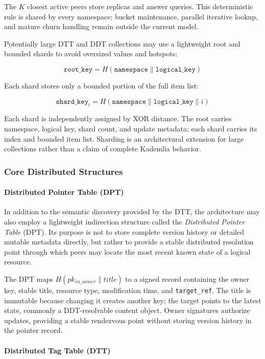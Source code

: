 \documentclass[12pt]{article}
\begin{document}
The $K$ closest active peers store replicas and answer queries. This deterministic rule is shared by every namespace; bucket maintenance, parallel iterative lookup, and mature churn handling remain outside the current model.

Potentially large DTT and DDT collections may use a lightweight root and bounded shards to avoid oversized values and hotspots:

\[
\texttt{root\_key} = H(\texttt{namespace} \parallel \texttt{logical\_key})
\]

Each shard stores only a bounded portion of the full item list:

\[
\texttt{shard\_key}_i = H(\texttt{namespace} \parallel \texttt{logical\_key} \parallel i)
\]

Each shard is independently assigned by XOR distance. The root carries namespace, logical key, shard count, and update metadata; each shard carries its index and bounded item list. Sharding is an architectural extension for large collections rather than a claim of complete Kademlia behavior.


\subsubsection{Core Distributed Structures}

\paragraph{Distributed Pointer Table (DPT)}

In addition to the semantic discovery provided by the DTT, the architecture may also employ a lightweight indirection structure called the \textit{Distributed Pointer Table} (DPT). Its purpose is not to store complete version history or detailed mutable metadata directly, but rather to provide a stable distributed resolution point through which peers may locate the most recent known state of a logical resource.

The DPT maps $H(pk_{vn\_owner} \parallel title)$ to a signed record containing the owner key, stable title, resource type, modification time, and \texttt{target\_ref}. The title is immutable because changing it creates another key; the target points to the latest state, commonly a DDT-resolvable content object. Owner signatures authorize updates, providing a stable rendezvous point without storing version history in the pointer record.


\paragraph{Distributed Tag Table (DTT)}
\end{document}
